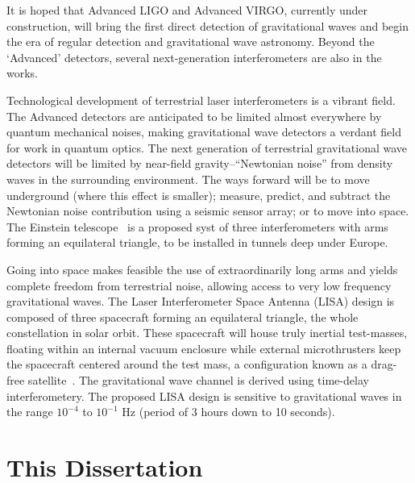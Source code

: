 It is hoped that Advanced LIGO and Advanced VIRGO, currently under
construction, will bring the first direct detection of gravitational
waves and begin the era of regular detection and gravitational wave
astronomy.
%
Beyond the `Advanced' detectors, several next-generation
interferometers are also in the works.

Technological development of terrestrial laser
interferometers is a vibrant field.  The Advanced detectors are
anticipated to be limited almost everywhere by quantum mechanical
noises, making gravitational wave detectors a verdant field for work
in quantum optics.  The next generation of terrestrial gravitational
wave detectors will be limited by near-field gravity--``Newtonian
noise'' from density waves in the surrounding environment.  The ways
forward will be to move underground (where this effect is smaller);
measure, predict, and subtract the Newtonian noise contribution using
a seismic sensor array; or to move into space.
%
The Einstein telescope~\cite{EinsteinTelescopeDesignStudy2011} is a
proposed syst of three interferometers with arms forming an
equilateral triangle, to be installed in tunnels deep under Europe.

Going into space makes feasible the use of extraordinarily long arms
and yields complete freedom from terrestrial noise, allowing access to
very low frequency gravitational waves.  The Laser Interferometer
Space Antenna (LISA) design is composed of three spacecraft forming an
equilateral triangle, the whole constellation in solar orbit\cite{Danzmann2003LISA}.  These
spacecraft will house truly inertial test-masses, floating within an
internal vacuum enclosure while external microthrusters keep the
spacecraft centered around the test mass, a configuration known as a drag-free satellite~\cite{Lange1964DragFree}.  The gravitational wave
channel is derived using time-delay interferometery.  The proposed
LISA design is sensitive to gravitational waves in the range $10^{-4}$
to $10^{-1}$ Hz (period of 3 hours down to 10 seconds).

\section{This Dissertation}

